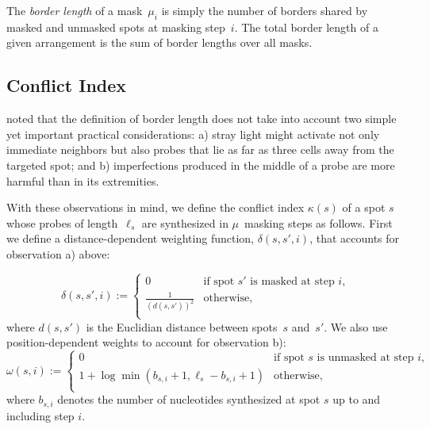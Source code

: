 \documentclass{bioinfo}
\begin{document}
The \emph{border length} of a mask~$\mu_{i}$ is simply the number of borders shared by masked and unmasked spots at masking step~$i$. The total border length of a given arrangement is the sum of border lengths over all masks.

\subsection{Conflict Index}

\citealp{KAHNG03_1} noted that the definition of border length does not take into account two simple yet important practical considerations: a) stray light might activate not only immediate neighbors but also probes that lie as far as three cells away from the targeted spot; and b) imperfections produced in the middle of a probe are more harmful than in its extremities.

With these observations in mind, we define the conflict index $\kappa(s)$ of a spot $s$ whose probes of length~$\ell_{s}$ are synthesized in $\mu$~masking steps as follows. First we define a distance-dependent weighting function, $\delta(s,s',i)$, that accounts for observation a) above:

\begin{equation}
\label{eq:dist_weight} \delta(s,s',i) :=
        \left\{
                \begin{array}{ll}
                        0 & \mbox{if spot $s'$ is masked at step $i$}, \\
                        \frac{1}{(d(s,s'))^{2}} & \mbox{otherwise}, \\
                \end{array}
        \right.
\end{equation}
where $d(s,s')$ is the Euclidian distance between spots~$s$ and~$s'$. We also use position-dependent weights to account for observation b):
\begin{equation}
\label{eq:pos_mult} \omega(s,i) :=
        \left\{
                \begin{array}{ll}
                        0 & \mbox{if spot $s$ is unmasked at step $i$}, \\
                        1 + \log{\min(b_{s,i} + 1,\ell_{s} - b_{s,i} + 1)} & \mbox{otherwise}, \\
                \end{array}
        \right.
\end{equation}
where $b_{s,i}$ denotes the number of nucleotides synthesized at spot $s$ up to and including step $i$.
\end{document}
